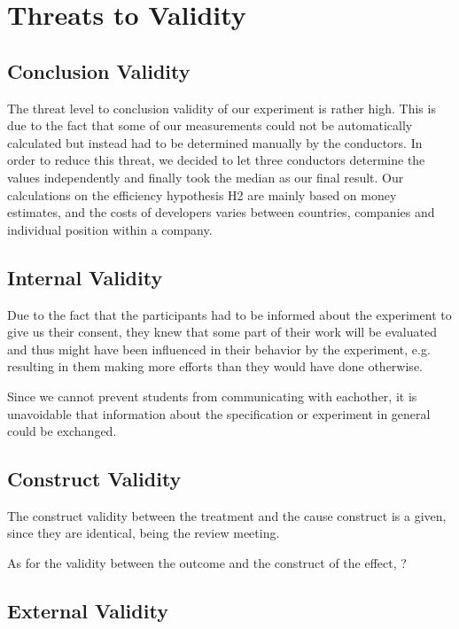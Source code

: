 \section{Threats to Validity}

\subsection{Conclusion Validity}

The threat level to conclusion validity of our experiment is rather high. This is due to the fact
that some of our measurements could not be automatically calculated but instead had to be determined
manually by the conductors. In order to reduce this threat, we decided to let three conductors
determine the values independently and finally took the median as our final result.
Our calculations on the efficiency hypothesis H2 are mainly based on money estimates, and the costs of developers varies between countries, companies and individual position within a company.

\subsection{Internal Validity}

Due to the fact that the participants had to be informed about the experiment to give us their
consent, they knew that some part of their work will be evaluated and thus might have been
influenced in their behavior by the experiment, e.g. resulting in them making more efforts than they would have done otherwise.

Since we cannot prevent students from communicating with eachother, it is unavoidable that information about the specification or experiment in general could be exchanged.

\subsection{Construct Validity}

The construct validity between the treatment and the cause construct is a given, since they are identical, being the review meeting.

As for the validity between the outcome and the construct of the effect, ?

\subsection{External Validity}

